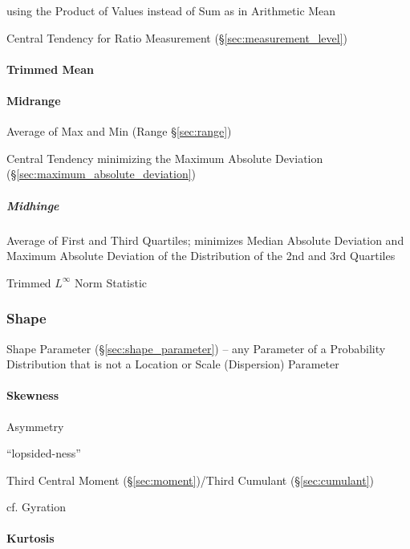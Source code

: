 using the Product of Values instead of Sum as in Arithmetic Mean

Central Tendency for Ratio Measurement (\S\ref{sec:measurement_level})



\paragraph{Trimmed Mean}\label{sec:trimmed_mean}\hfill



\paragraph{Midrange}\label{sec:midrange}\hfill

Average of Max and Min (Range \S\ref{sec:range})

Central Tendency minimizing the Maximum Absolute Deviation
(\S\ref{sec:maximum_absolute_deviation})



\subparagraph{Midhinge}\label{sec:midhinge}\hfill

Average of First and Third Quartiles; minimizes Median Absolute Deviation and
Maximum Absolute Deviation of the Distribution of the 2nd and 3rd Quartiles

Trimmed $L^\infty$ Norm Statistic



\subsubsection{Shape}\label{sec:distribution_shape}

\fist Shape Parameter (\S\ref{sec:shape_parameter}) -- any Parameter of a
Probability Distribution that is not a Location or Scale (Dispersion) Parameter



\paragraph{Skewness}\label{sec:skewness}\hfill

Asymmetry %

``lopsided-ness''

Third Central Moment (\S\ref{sec:moment})/Third Cumulant (\S\ref{sec:cumulant})

cf. Gyration



\paragraph{Kurtosis}\label{sec:kurtosis}\hfill

